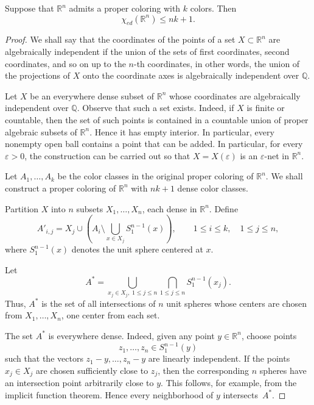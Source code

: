 \documentclass[10pt,a4paper]{amsart}
\begin{document}
\begin{theorem}
Suppose that $\mathbb{R}^n$ admits a proper coloring with $k$ colors.
Then
\[
    \chi_{ed}(\mathbb{R}^n)\leq nk+1.
\]
\label{thm:main}
\end{theorem}

\begin{proof}
We shall say that the coordinates of the points of a set
$X\subset\mathbb{R}^n$ are algebraically independent if the union of the
sets of first coordinates, second coordinates, and so on up to the
$n$-th coordinates, in other words, the union of the projections of $X$ onto
the coordinate axes is algebraically independent over $\mathbb{Q}$.

Let $X$ be an everywhere dense subset of $\mathbb{R}^n$ whose coordinates
are algebraically independent over $\mathbb{Q}$. Observe that such a set exists. Indeed, if $X$ is finite
or countable, then the set of such points is contained in a countable union
of proper algebraic subsets of \(\mathbb R^n\). Hence it has empty
interior. In particular, every nonempty open ball contains a point that
can be added.  In particular, for every $\varepsilon>0$,
the construction can be carried out so that $X=X(\varepsilon)$ is an
$\varepsilon$-net in $\mathbb{R}^n$.

Let $A_1,\dots,A_k$ be the color classes in the original proper coloring
of $\mathbb{R}^n$. We shall construct a proper coloring of $\mathbb{R}^n$
with $nk+1$ dense color classes.

Partition $X$ into $n$ subsets
$X_1,\dots,X_n$, each dense in $\mathbb{R}^n$. Define
\[
    A'_{i,j}
    =
    X_j\cup
    \left(
        A_i\setminus
        \bigcup_{x\in X_j}S^{n-1}_1(x)
    \right),
    \qquad
    1\leq i\leq k,\quad 1\leq j\leq n,
\]
where $S^{n-1}_1(x)$ denotes the unit sphere centered at $x$.

Let
\[
    A^*
    =
    \bigcup_{x_j\in X_j,\;1\leq j\leq n}
    \bigcap_{1\leq j\leq n} S^{n-1}_1(x_j).
\]
Thus, $A^*$ is the set of all intersections of $n$ unit spheres whose
centers are chosen from $X_1,\dots,X_n$, one center from each set.

The set $A^*$ is everywhere dense. Indeed, given any point
$y\in\mathbb{R}^n$, choose points
\[
z_1,\dots,z_n\in S^{n-1}_1(y)
\]
such that the vectors $z_1-y,\dots,z_n-y$ are linearly independent.
If the points $x_j\in X_j$ are chosen sufficiently close to $z_j$, then
the corresponding $n$ spheres have an intersection point arbitrarily
close to $y$. This follows, for example, from the implicit function
theorem. Hence every neighborhood of $y$ intersects~$A^*$.


\end{proof}
\end{document}
